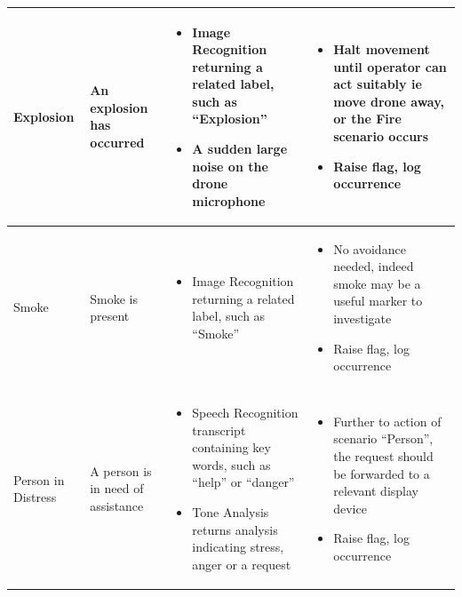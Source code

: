 \documentclass{article}
\begin{document}
\begin{table}[ht]
\begin{tabularx}{\textwidth}{| >{\centering}m{1.5cm} | >{\centering}m{2cm} | X | X |}
    Explosion & \vspace{\baselineskip} An explosion has occurred &
    \begin{itemize} [topsep=0pt, leftmargin=0cm,itemindent=.5cm,labelwidth=\itemindent,labelsep=0cm,align=left]
        \item Image Recognition returning a related label, such as “Explosion”
        \item A sudden large noise on the drone microphone
    \end{itemize} &
    \begin{itemize} [topsep=0pt, leftmargin=0cm,itemindent=.5cm,labelwidth=\itemindent,labelsep=0cm,align=left]
        \item Halt movement until operator can act suitably ie move drone away, or the Fire scenario occurs
        \item Raise flag, log occurrence
    \end{itemize} \\ \hline

    Smoke & \vspace{\baselineskip} Smoke is present &
    \begin{itemize} [topsep=0pt, leftmargin=0cm,itemindent=.5cm,labelwidth=\itemindent,labelsep=0cm,align=left]
        \item Image Recognition returning a related label, such as “Smoke”
    \end{itemize} &
    \begin{itemize} [topsep=0pt, leftmargin=0cm,itemindent=.5cm,labelwidth=\itemindent,labelsep=0cm,align=left]
        \item No avoidance needed, indeed smoke may be a useful marker to investigate
        \item Raise flag, log occurrence
    \end{itemize} \\ \hline

    Person in Distress & \vspace{\baselineskip} A person is in need of assistance &
    \begin{itemize} [topsep=0pt, leftmargin=0cm,itemindent=.5cm,labelwidth=\itemindent,labelsep=0cm,align=left]
        \item Speech Recognition transcript containing key words, such as ``help'' or ``danger''
        \item Tone Analysis returns analysis indicating stress, anger or a request
    \end{itemize} &
    \begin{itemize} [topsep=0pt, leftmargin=0cm,itemindent=.5cm,labelwidth=\itemindent,labelsep=0cm,align=left]
        \item Further to action of scenario ``Person'', the request should be forwarded to a relevant display device
        \item Raise flag, log occurrence
    \end{itemize} \\ \hline


\end{tabularx}
\end{table}

\printbibliography[title={Whole Bibliography}]
\end{document}
